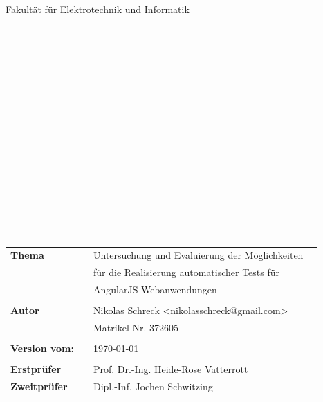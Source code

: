\begin{center}
	\Large{Fakultät für Elektrotechnik und Informatik}
\end{center}
\begin{verbatim}




\end{verbatim}
\begin{center}
	\doublespacing
	\textbf{\LARGE{\titleDocument}}\\
	\singlespacing
	\begin{verbatim}
	
	\end{verbatim}
	\textbf{{~\subjectDocument~}}
\end{center}
\begin{verbatim}

\end{verbatim}
\begin{center}
	
\end{center}
\begin{verbatim}







\end{verbatim}
\begin{flushleft}
	\begin{tabular}{llll}
		\textbf{Thema} & & Untersuchung und Evaluierung der Möglichkeiten & \\
		& & für die Realisierung automatischer Tests für & \\
		& &  AngularJS-Webanwendungen  & \\
		& & \\
		\textbf{Autor} & & Nikolas Schreck <nikolasschreck@gmail.com> & \\
		& & Matrikel-Nr. 372605 & \\
		& & \\
		\textbf{Version vom:} & & \today &\\
		& & \\
		\textbf{Erstprüfer} & & Prof. Dr.-Ing. Heide-Rose Vatterrott &\\
		\textbf{Zweitprüfer} & & Dipl.-Inf. Jochen Schwitzing &\\
	\end{tabular}
\end{flushleft}